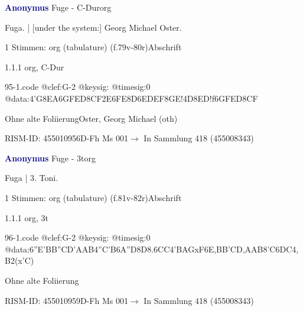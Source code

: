 \documentclass[twocolumn]{book}
\begin{document}
\par \vspace{7pt} \textcolor{darkblue}{\textbf{Anonymus  }}\hfillplus{\textbf{[95]}}\newline Fuge - C-Dur\newline org
\par \begin{itshape}[f.79v, at left:] Fuga. | [under the system:] Georg Michael Oster.\end{itshape} 
\par \textcolor{darkblue}{}  1 Stimmen: org (tabulature)  (f.79v-80r)\newline Abschrift
\par 1.1.1  org, C-Dur  
\begin{filecontents*}{95-1.code}
@clef:G-2
@keysig:
@timesig:0
@data:4'G{8EA}{6GFED}{8CF}2E{6FE8D}{6EDEF}{8GE}!4D{8ED}!f{6GFED}{8CF}
\end{filecontents*}
\newline
%
\par Ohne alte Foliierung\newline Oster, Georg Michael  (oth)
\par RISM-ID: 455010956\newline D-Fh  Ms 001\newline $\rightarrow$ In Sammlung 418 (455008343)
      
\par \vspace{7pt} \textcolor{darkblue}{\textbf{Anonymus  }}\hfillplus{\textbf{[96]}}\newline Fuge - 3t\newline org
\par \begin{itshape}[f.81v, at left:] Fuga | 3. Toni.\end{itshape} 
\par \textcolor{darkblue}{}  1 Stimmen: org (tabulature)  (f.81v-82r)\newline Abschrift
\par 1.1.1  org, 3t  
\begin{filecontents*}{96-1.code}
@clef:G-2
@keysig:
@timesig:0
@data:{6''E'BB''C}{D'AAB}4''C'B{6A''D}8D{8.6CC}4'BAGxF{6E,BB'C}{D,AAB}8'C{6DC}4,B2(x'C)
\end{filecontents*}
\newline
%
\par Ohne alte Foliierung
\par RISM-ID: 455010959\newline D-Fh  Ms 001\newline $\rightarrow$ In Sammlung 418 (455008343)
      
\end{document}
